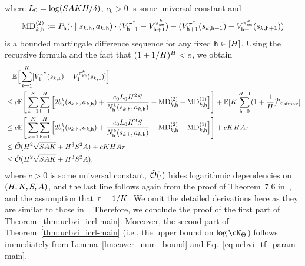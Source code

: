 where $L_0=\log({S}{A}{K}{H}/\delta)$,  $c_0>0$ is some universal constant and 
\begin{align*}
 {\mathrm{MD}}^{(2)}_{k,{\mathsf{h}}}:={P}_{\mathsf{h}}(\cdot\mid{s}_{k,{\mathsf{h}}},{a}_{k,{\mathsf{h}}})\cdot({{V}}_{{\mathsf{h}}+1}^{\pi^*}-{{V}}_{{\mathsf{h}}+1}^{{\pi}^k_{\mathsf{sm}}})-  ({{V}}_{{\mathsf{h}}+1}^{\pi^*}({s}_{k,{\mathsf{h}}+  1})-{{V}}_{{\mathsf{h}}+1}^{{\pi}^k_{\mathsf{sm}}}({s}_{k,{\mathsf{h}}+  1})) 
\end{align*} is a bounded martingale difference sequence for any fixed ${\mathsf{h}}\in[{H}]$. Using the recursive formula and the fact that $(1+1/{H})^{H}<e$, we obtain
\begin{align*}
 &\quad \mathbb{E}\Big[ \sum_{k=1}^{K} [{{V}}_1^{{\pi^*}}({s}_{k,1})-{{V}}_1^{{\pi}^k_{{\mathsf{sm}}}}({s}_{k,1})
 ]  \Big]\\
 &\leq c\mathbb{E}\Bigg[\sum_{k=1}^{K}\sum_{{\mathsf{h}}=1}^{H}\Big[2{b}_{\mathsf{h}}^k({s}_{k,{\mathsf{h}}},{a}_{k,{\mathsf{h}}})
+
\frac{c_0L_0{H}^2{S}}{{N}^k_{\mathsf{h}}({s}_{k,{\mathsf{h}}},{a}_{k,{\mathsf{h}}})}+{\mathrm{MD}}^{(2)}_{k,{\mathsf{h}}}+{\mathrm{MD}}^{(1)}_{k,{\mathsf{h}}}\Big]\Bigg]+\mathbb{E}[{K}\sum_{{\mathsf{h}}=0}^{{H}-1}(1+\frac{1}{{H}})^{\mathsf{h}}{\varepsilon_{\mathrm{sfmax}}}]\\
&\leq c\mathbb{E}\Bigg[\sum_{k=1}^{K}\sum_{{\mathsf{h}}=1}^{H}\Big[2{b}_{\mathsf{h}}^k({s}_{k,{\mathsf{h}}},{a}_{k,{\mathsf{h}}})
+
\frac{c_0L_0{H}^2{S}}{{N}^k_{\mathsf{h}}({s}_{k,{\mathsf{h}}},{a}_{k,{\mathsf{h}}})}+{\mathrm{MD}}^{(2)}_{k,{\mathsf{h}}}+{\mathrm{MD}}^{(1)}_{k,{\mathsf{h}}}\Big]\Bigg]+c{K}{H}{A}{\tau}\\
&\leq 
{\tilde{\mathcal O}} ({H}^2\sqrt{{S}{A}{K}}+{H}^3{S}^2{A})+c{K}{H}{A}{\tau}\\
&\leq {\tilde{\mathcal O}}({H}^2\sqrt{{S}{A}{K}}+{H}^3{S}^2{A}),
\end{align*} where $c>0$ is some universal constant,  ${\tilde{\mathcal O}}(\cdot)$ hides logarithmic dependencies on $({H},{K},{S},{A})$, and the last line follows again from the proof of Theorem~7.6 in~\cite{agarwal2019reinforcement}, and the assumption that ${\tau}=1/{K}$.
 We omit the detailed derivations here as they are similar to those in~\cite{azar2017minimax,agarwal2019reinforcement}. Therefore, we conclude the proof of the first part of Theorem~\ref{thm:ucbvi_icrl-main}. Moreover,  the second part of Theorem~\ref{thm:ucbvi_icrl-main} (i.e., the upper bound on $\log\cN_{\tfparspace}$) follows immediately from Lemma~\ref{lm:cover_num_bound} and Eq.~\eqref{eq:ucbvi_tf_param-main}.

 
